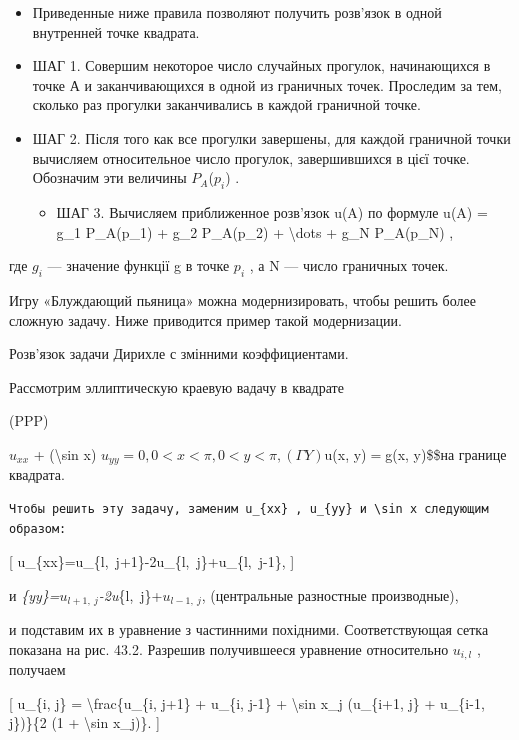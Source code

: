 \documentclass[
]{article}
\providecommand{\tightlist}{%
  \setlength{\itemsep}{0pt}\setlength{\parskip}{0pt}}
\begin{document}
\begin{itemize}
\item
  Приведенные ниже правила позволяют получить розв'язок в одной
  внутренней точке квадрата.
\item
  ШАГ 1. Совершим некоторое число случайных прогулок, начинающихся в
  точке А и заканчивающихся в одной из граничных точек. Проследим за
  тем, сколько раз прогулки заканчивались в каждой граничной точке.
\item
  ШАГ 2. Після того как все прогулки завершены, для каждой граничной
  точки вычисляем относительное число прогулок, завершившихся в цієї
  точке. Обозначим эти величины \(P_A\)(\(p_i\)) .

  \begin{itemize}
  \tightlist
  \item
    ШАГ 3. Вычисляем приближенное розв'язок u(A) по формуле u(A) = g\_1
    P\_A(p\_1) + g\_2 P\_A(p\_2) + \textbackslash dots + g\_N P\_A(p\_N)
    ,
  \end{itemize}
\end{itemize}

где \(g_i\) --- значение функції g в точке \(p_i\) , а N --- число
граничных точек.

Игру «Блуждающий пьяница» можна модернизировать, чтобы решить более
сложную задачу. Ниже приводится пример такой модернизации.

Розв'язок задачи Дирихле с змінними коэффициентами.

Рассмотрим эллиптическую краевую вадачу в квадрате

(PPP)

\(u_{xx}\) + (\textbackslash sin x)
\(u_{yy} = 0 , 0 < x < \pi , 0 < y < \pi , (\Gamma Y)\)u(x, y)\(=\)g(x,
y)\$\$на границе квадрата.

\begin{verbatim}
Чтобы решить эту задачу, заменим u_{xx} , u_{yy} и \sin x следующим образом:
\end{verbatim}

{[} u\_\{xx\}=u\_\{l,~j+1\}-2u\_\{l,~j\}+u\_\{l,~j-1\}, {]}

и \emph{\{yy\}=\(u_{l+1,\ j}\)-2u}\{l,~j\}+\(u_{l-1,\ j}\), (центральные
разностные производные),

и подставим их в уравнение з частинними похідними. Соответствующая сетка
показана на рис. 43.2. Разрешив получившееся уравнение относительно
\(u_{i,l}\) , получаем

{[} u\_\{i, j\} = \textbackslash frac\{u\_\{i, j+1\} + u\_\{i, j-1\} +
\textbackslash sin x\_j (u\_\{i+1, j\} + u\_\{i-1, j\})\}\{2 (1 +
\textbackslash sin x\_j)\}. {]}
\end{document}
